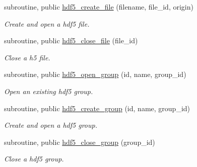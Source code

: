 \begin{DoxyCompactItemize}
subroutine, public \hyperlink{classmodhdf5_a4108148cefef713392f3f1da426e75d2}{hdf5\-\_\-create\-\_\-file} (filename, file\-\_\-id, origin)
\begin{DoxyCompactList}\small\item\em Create and open a hdf5 file. \end{DoxyCompactList}\item 
subroutine, public \hyperlink{classmodhdf5_af70ee678ccdc5ce829431ebe909264a9}{hdf5\-\_\-close\-\_\-file} (file\-\_\-id)
\begin{DoxyCompactList}\small\item\em Close a h5 file. \end{DoxyCompactList}\item 
subroutine, public \hyperlink{classmodhdf5_ae547666d0167e2a78d6529e11c1faa92}{hdf5\-\_\-open\-\_\-group} (id, name, group\-\_\-id)
\begin{DoxyCompactList}\small\item\em Open an existing hdf5 group. \end{DoxyCompactList}\item 
subroutine, public \hyperlink{classmodhdf5_a5486f9c861f7b8ee2060015acf0169a4}{hdf5\-\_\-create\-\_\-group} (id, name, group\-\_\-id)
\begin{DoxyCompactList}\small\item\em Create and open a hdf5 group. \end{DoxyCompactList}\item 
subroutine, public \hyperlink{classmodhdf5_aba547bfdd3dc38385069b0885ab5d526}{hdf5\-\_\-close\-\_\-group} (group\-\_\-id)
\begin{DoxyCompactList}\small\item\em Close a hdf5 group. \end{DoxyCompactList}\end{DoxyCompactItemize}
